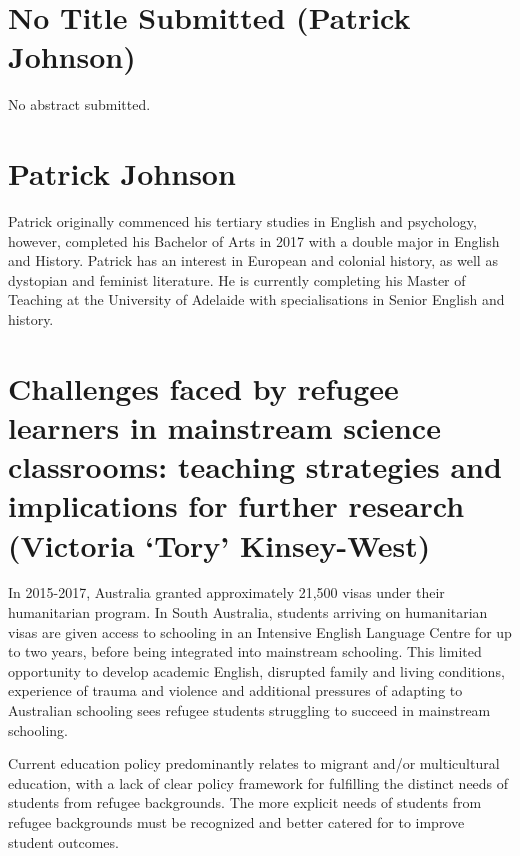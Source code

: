 \documentclass[twoside,14pt,a4paper,notitlepage]{memoir}
\begin{document}
\section*{No Title Submitted (Patrick Johnson)}
\label{aut:johnson}

No abstract submitted.

\section*{Patrick Johnson}

Patrick originally commenced his tertiary studies in English and psychology, however, completed his Bachelor of Arts in 2017 with a double major in English and History. Patrick has an interest in European and colonial history, as well as dystopian and feminist literature. He is currently completing his Master of Teaching at the University of Adelaide with specialisations in Senior English and history.



\section*{Challenges faced by refugee learners in mainstream science classrooms: teaching strategies and implications for further research (Victoria `Tory' Kinsey-West)}
\label{aut:west}

In 2015-2017, Australia granted approximately 21,500 visas under their humanitarian program. In South Australia, students arriving on humanitarian visas are given access to schooling in an Intensive English Language Centre for up to two years, before being integrated into mainstream schooling. This limited opportunity to develop academic English, disrupted family and living conditions, experience of trauma and violence and additional pressures of adapting to Australian schooling sees refugee students struggling to succeed in mainstream schooling.  
 
Current education policy predominantly relates to migrant and/or multicultural education, with a lack of clear policy framework for fulfilling the distinct needs of students from refugee backgrounds. The more explicit needs of students from refugee backgrounds must be recognized and better catered for to improve student outcomes. 
 
\end{document}
